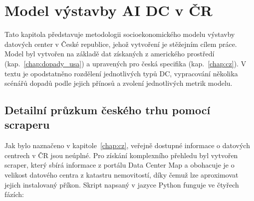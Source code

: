 \chapter{Model výstavby AI DC v ČR}
\label{chap:model}

Tato kapitola představuje metodologii socioekonomického modelu výstavby datových center v České republice, jehož vytvoření je stěžejním cílem práce. Model byl vytvořen na základě dat získaných z amerického prostředí (kap.~\ref{chap:dopady_usa}) a upravených pro česká specifika (kap.~\ref{chap:cz}). V textu je opodstatněno rozdělení jednotlivých typů DC, vypracování několika scénářů dopadů podle jejich přínosů a zvolení jednotlivých metrik modelu.

\section{Detailní průzkum českého trhu pomocí scraperu}
\label{sec:model_scraper}


Jak bylo naznačeno v kapitole~\ref{chap:cz}, veřejně dostupné informace o datových centrech v ČR jsou neúplné. Pro získání komplexního přehledu byl vytvořen scraper, který sbírá informace z portálu Data Center Map a obohacuje je o velikost datového centra z katastru nemovitostí, díky čemuž lze aproximovat jejich instalovaný příkon. Skript napsaný v jazyce Python funguje ve čtyřech fázích:

